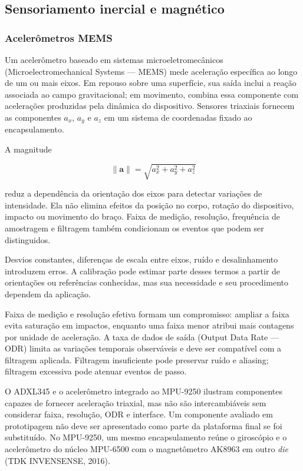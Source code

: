 \documentclass[a4paper,12pt]{article}
\begin{document}
\subsection{Sensoriamento inercial e magn\'etico}


\subsubsection{Aceler\^ometros MEMS}


Um aceler\^ometro baseado em sistemas microeletromec\^anicos (Microelectromechanical Systems --- MEMS) mede acelera\c{c}\~ao espec\'ifica ao longo de um ou mais eixos. Em repouso sobre uma superf\'icie, sua sa\'ida inclui a rea\c{c}\~ao associada ao campo gravitacional; em movimento, combina essa componente com acelera\c{c}\~oes produzidas pela din\^amica do dispositivo. Sensores triaxiais fornecem as componentes \(a_x\), \(a_y\) e \(a_z\) em um sistema de coordenadas fixado ao encapsulamento.


A magnitude


\[
\lVert\mathbf{a}\rVert=\sqrt{a_x^2+a_y^2+a_z^2}
\]


reduz a depend\^encia da orienta\c{c}\~ao dos eixos para detectar varia\c{c}\~oes de intensidade. Ela n\~ao elimina efeitos da posi\c{c}\~ao no corpo, rota\c{c}\~ao do dispositivo, impacto ou movimento do bra\c{c}o. Faixa de medi\c{c}\~ao, resolu\c{c}\~ao, frequ\^encia de amostragem e filtragem tamb\'em condicionam os eventos que podem ser distinguidos.


Desvios constantes, diferen\c{c}as de escala entre eixos, ru\'ido e desalinhamento introduzem erros. A calibra\c{c}\~ao pode estimar parte desses termos a partir de orienta\c{c}\~oes ou refer\^encias conhecidas, mas sua necessidade e seu procedimento dependem da aplica\c{c}\~ao.


Faixa de medi\c{c}\~ao e resolu\c{c}\~ao efetiva formam um compromisso: ampliar a faixa evita satura\c{c}\~ao em impactos, enquanto uma faixa menor atribui mais contagens por unidade de acelera\c{c}\~ao. A taxa de dados de sa\'ida (Output Data Rate --- ODR) limita as varia\c{c}\~oes temporais observ\'aveis e deve ser compat\'ivel com a filtragem aplicada. Filtragem insuficiente pode preservar ru\'ido e aliasing; filtragem excessiva pode atenuar eventos de passo.


O ADXL345 e o aceler\^ometro integrado ao MPU-9250 ilustram componentes capazes de fornecer acelera\c{c}\~ao triaxial, mas n\~ao s\~ao intercambi\'aveis sem considerar faixa, resolu\c{c}\~ao, ODR e interface. Um componente avaliado em prototipagem n\~ao deve ser apresentado como parte da plataforma final se foi substitu\'ido. No MPU-9250, um mesmo encapsulamento re\'une o girosc\'opio e o aceler\^ometro do n\'ucleo MPU-6500 com o magnet\^ometro AK8963 em outro \emph{die} (TDK INVENSENSE, 2016).
\end{document}
